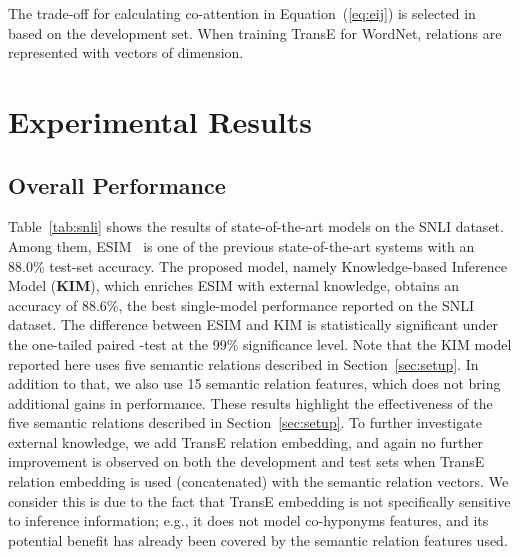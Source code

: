 \documentclass[11pt,a4paper]{article}
\begin{document}
The trade-off  for calculating co-attention in Equation~(\ref{eq:eij}) is selected in  based on the development set. When training TransE for WordNet, relations are represented with vectors of  dimension.

\section{Experimental Results}
\label{sec:res}
\subsection{Overall Performance} 

Table~\ref{tab:snli} shows the results of state-of-the-art models on the SNLI dataset. 
Among them, ESIM~\citep{DBLP:conf/acl/ChenZLWJI17} is one of the previous state-of-the-art systems with an 88.0\% test-set accuracy. The proposed model, namely Knowledge-based Inference Model (\textbf{KIM}), which enriches ESIM with external knowledge, obtains an accuracy of 88.6\%, the best single-model performance reported on the SNLI dataset. The difference between ESIM and KIM is statistically significant under the one-tailed paired -test at the 99\% significance level. Note that the KIM model reported here uses five semantic relations described in Section~\ref{sec:setup}. In addition to that, we also use 15 semantic relation features, which does not bring additional gains in performance. These results highlight the effectiveness of the five semantic relations described in Section~\ref{sec:setup}. To further investigate external knowledge, we add TransE relation embedding, and again no further improvement is observed on both the development and test sets when TransE relation embedding is used (concatenated) with the semantic relation vectors. We consider this is due to the fact that TransE embedding is not specifically sensitive to inference information; e.g., it does not model co-hyponyms features, and its potential benefit has already been covered by the semantic relation features used.   
\end{document}
